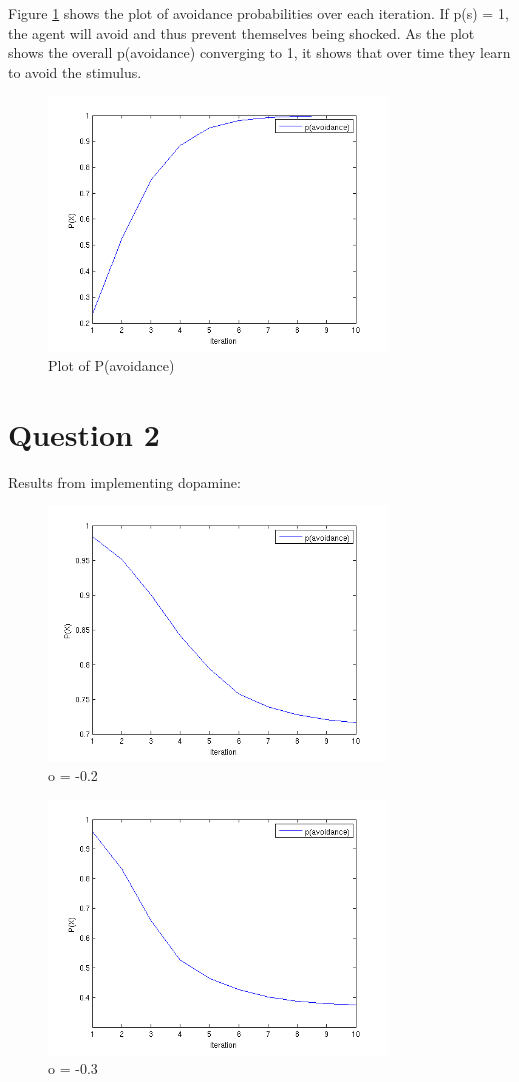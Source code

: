 \documentclass[11pt, twocolumn]{report}
\begin{document}
Figure \ref{avoidance} shows the plot of avoidance probabilities over each iteration. If p(s) = 1, the agent will avoid and thus prevent themselves being shocked. As the plot shows the overall p(avoidance) converging to 1, it shows that over time they learn to avoid the stimulus. 

\begin{figure}[H]
\centering
\includegraphics[width=90mm]{assignment2_images/pa.png}
\caption{Plot of P(avoidance)}
\label{avoidance}
\end{figure}

\section{Question 2}
Results from implementing dopamine:

\begin{figure}[H]
\centering
\includegraphics[width=90mm]{assignment2_images/p_av_2.png}
\caption{o = -0.2}
\label{dop1}
\end{figure}

\begin{figure}[H]
\centering
\includegraphics[width=90mm]{assignment2_images/p_av_3.png}
\caption{o = -0.3}
\label{dop2}
\end{figure}
\end{document}
